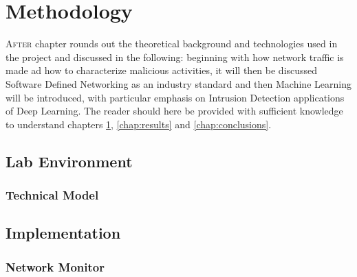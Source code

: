 \chapter{Methodology}
\label{chap:methodology}

\lettrine[lines=3, findent=3pt, nindent=0pt]{A}{fter} chapter rounds out the theoretical background and technologies used in the project and discussed in the following: beginning with how network traffic is made ad how to characterize malicious activities, it will then be discussed Software Defined Networking as an industry standard and then Machine Learning will be introduced, with particular emphasis on Intrusion Detection applications of Deep Learning. The reader should here be provided with sufficient knowledge to understand chapters \ref{chap:methodology}, \ref{chap:results} and \ref{chap:conclusions}.


\section{Lab Environment}
\label{sec:environment}

\lipsum


\subsection{Technical Model}
\label{subsec:technical-model}

\lipsum


\section{Implementation}
\label{sec:implemntation}

\lipsum


\subsection{Network Monitor}
\label{subsec:monitor-implementation}

